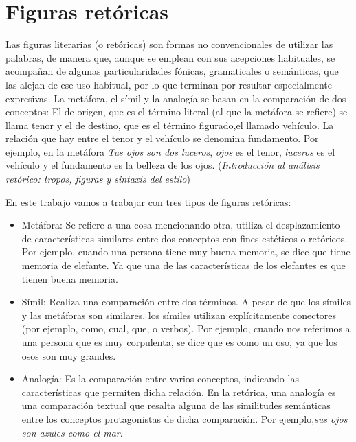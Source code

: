 \section{Figuras retóricas}
\label{cap:sec:figurasretoricasl}
Las figuras literarias (o retóricas) son formas no convencionales de utilizar las palabras, de manera que, aunque se emplean con sus acepciones habituales, se acompañan de algunas particularidades fónicas, gramaticales o semánticas, que las alejan de ese uso habitual, por lo que terminan por resultar especialmente expresivas. 
La metáfora, el símil y la analogía se basan en la comparación de dos conceptos: El de origen, que es el término literal (al que la metáfora se refiere) se llama tenor y el de destino, que es el término figurado,el llamado vehículo. La relación que hay entre el tenor y el vehículo se denomina fundamento. Por ejemplo, en la metáfora \textit{Tus ojos son dos luceros}, \textit{ojos} es el tenor, \textit{luceros} es el vehículo y el fundamento es la belleza de los ojos.
(\textit {Introducción al análisis retórico: tropos, figuras y sintaxis del estilo})
\citep{GalianaYCasas1994}

En este trabajo vamos a trabajar con tres tipos de figuras retóricas: 
\begin{itemize}
	\item Metáfora: Se refiere a una cosa mencionando otra, utiliza el desplazamiento de características similares entre dos conceptos con fines estéticos o retóricos. Por ejemplo, cuando una persona tiene muy buena memoria, se dice que tiene memoria de elefante. Ya que una de las características de los elefantes es que tienen buena memoria.
	
	\item Símil: Realiza una comparación entre dos términos. A pesar de que los símiles y las metáforas son similares, los símiles utilizan explícitamente conectores (por ejemplo, como, cual, que, o verbos).
	Por ejemplo, cuando nos referimos a una persona que es muy corpulenta, se dice que es como un oso, ya que los osos son muy grandes.
	
	\item Analogía: Es la comparación entre varios conceptos, indicando las características que permiten dicha relación. En la retórica, una analogía es una comparación textual que resalta alguna de las similitudes semánticas entre los conceptos protagonistas de dicha comparación. Por ejemplo,\textit{sus ojos son azules como el mar}.
	
	
	
\end{itemize}

